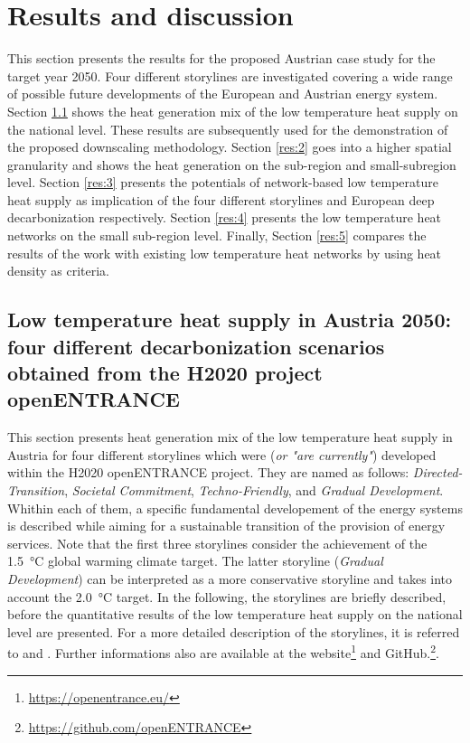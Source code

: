 \section{Results and discussion}

This section presents the results for the proposed Austrian case study for the target year 2050. Four different storylines are investigated covering a wide range of possible future developments of the European and Austrian energy system. Section \ref{res:1} shows the heat generation mix of the low temperature heat supply on the national level. These results are subsequently used for the demonstration of the proposed downscaling methodology. Section \ref{res:2} goes into a higher spatial granularity and shows the heat generation on the sub-region and small-subregion level. Section \ref{res:3} presents the potentials of network-based low temperature heat supply as implication of the four different storylines and European deep decarbonization respectively. Section \ref{res:4} presents the low temperature heat networks on the small sub-region level. Finally, Section \ref{res:5} compares the results of the work with existing low temperature heat networks by using heat density as criteria.

\subsection{Low temperature heat supply in Austria 2050: four different decarbonization scenarios obtained from the H2020 project openENTRANCE}\label{res:1}
This section presents heat generation mix of the low temperature heat supply in Austria for four different storylines which were (\textit{or "are currently"}) developed within the H2020 openENTRANCE project. They are named as follows: \textit{Directed-Transition}, \textit{Societal Commitment}, \textit{Techno-Friendly}, and \textit{Gradual Development}. Whithin each of them, a specific fundamental developement of the energy systems is described while aiming for a sustainable transition of the provision of energy services. Note that the first three storylines consider the achievement of the \SI{1.5}{\degreeCelsius} global warming climate target. The latter storyline (\textit{Gradual Development}) can be interpreted as a more conservative storyline and takes into account the \SI{2.0}{\degreeCelsius} target. In the following, the storylines are briefly described, before the quantitative results of the low temperature heat supply on the national level are presented. For a more detailed description of the storylines, it is referred to \cite{auer2020quantitative} and \cite{auer2020development}. Further informations also are available at the website\footnote{\url{https://openentrance.eu/}} and GitHub.\footnote{\url{https://github.com/openENTRANCE}}.\newline

